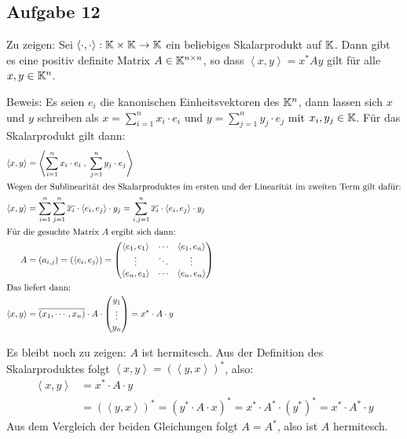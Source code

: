 \subsection*{Aufgabe 12}
Zu zeigen: Sei $\left<\cdot , \cdot \right>: \mathbb K\times\mathbb K \rightarrow \mathbb K$ ein beliebiges
Skalarprodukt auf $\mathbb K$. Dann gibt es eine positiv definite Matrix $A \in \mathbb K^{n \times n}$,
so dass $\left<x,y\right> = x^* A y$ gilt für alle $x,y \in \mathbb K^n$.

Beweis: Es seien $e_i$ die kanonischen Einheitsvektoren des $\mathbb K^n$, dann lassen
sich $x$ und $y$ schreiben als $x = \sum_{i = 1}^n x_i \cdot e_i$ und
$y = \sum_{j = 1}^n y_j \cdot e_j$ mit $x_i, y_j \in \mathbb K$. Für das Skalarprodukt
gilt dann:
\begin{align*}
  \left<x,y\right> &= \left< \sum_{i = 1}^n x_i \cdot e_i \;,\; \sum_{j = 1}^n y_j \cdot e_j \right> \\
  \intertext{Wegen der Sublinearität des Skalarproduktes im ersten und der Linearität im zweiten Term gilt dafür:}
  \left<x,y\right>  &=  \sum_{i = 1}^n \sum_{j = 1}^n \overline{x_i} \cdot \left<e_i,e_j\right> \cdot  y_j
  =\sum_{i, j = 1}^n  \overline{x_i} \cdot \left<e_i,e_j\right> \cdot y_j\\
  \intertext{Für die gesuchte Matrix $A$ ergibt sich dann:}
  A &= (a_{i,j}) = (\left<e_i,e_j\right>) =
   \begin{pmatrix}
     \left<e_1,e_1\right> & \cdots & \left<e_1,e_n\right>\\
     \vdots & \ddots & \vdots \\
     \left<e_n,e_1\right> & \cdots & \left<e_n,e_n\right>
   \end{pmatrix}
  \\
  \intertext{Das liefert dann:}
  \left<x,y\right>  &=  \overline{(x_1, \cdots, x_n)} \cdot A \cdot
    \begin{pmatrix} y_1 \\ \vdots \\ y_n \end{pmatrix} = x^* \cdot A \cdot y
\end{align*}

Es bleibt noch zu zeigen: $A$ ist hermitesch. Aus der Definition des Skalarproduktes
folgt $\left<x,y\right> = (\left<y,x\right>)^*$, also:
\begin{align*}
\left<x,y\right> &= x^* \cdot A \cdot y\\
   &= (\left<y,x\right>)^* = (y^* \cdot A  \cdot x)^* = x^*  \cdot A^*  \cdot (y^*)^*
   = x^* \cdot A^* \cdot y
\end{align*}
Aus dem Vergleich der beiden Gleichungen folgt $A = A^*$, also ist $A$ hermitesch.

